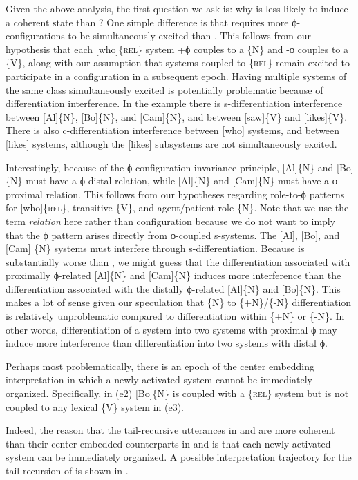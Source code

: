   Given the above analysis, the first question we ask is: why is  less likely to induce a coherent state than ? One simple difference is that  requires more ϕ-configurations to be simultaneously excited than . This follows from our hypothesis that each [who]\{\textsc{rel}\} system +ϕ couples to a \{N\} and -ϕ couples to a \{V\}, along with our assumption that systems coupled to \{\textsc{rel}\} remain excited to participate in a configuration in a subsequent epoch. Having multiple systems of the same class simultaneously excited is potentially problematic because of differentiation interference. In the example there is s-differentiation interference between [Al]\{N\}, [Bo]\{N\}, and [Cam]\{N\}, and between [saw]\{V\} and [likes]\{V\}. There is also c-differentiation interference between [who] systems, and between [likes] systems, although the [likes] subsystems are not simultaneously excited. 

  Interestingly, because of the ϕ-configuration invariance principle, [Al]\{N\} and [Bo]\{N\} must have a ϕ-distal relation, while [Al]\{N\} and [Cam]\{N\} must have a ϕ-proximal relation. This follows from our hypotheses regarding role-to-ϕ patterns for [who]\{\textsc{rel}\}, transitive \{V\}, and agent/patient role \{N\}. Note that we use the term \textit{relation} here rather than configuration because we do not want to imply that the ϕ pattern arises directly from ϕ-coupled s-systems. The [Al], [Bo], and [Cam] \{N\} systems must interfere through s-differentiation. Because  is substantially worse than , we might guess that the differentiation associated with proximally ϕ-related [Al]\{N\} and [Cam]\{N\} induces more interference than the differentiation associated with the distally ϕ-related [Al]\{N\} and [Bo]\{N\}. This makes a lot of sense given our speculation that \{N\} to \{+N\}/\{-N\} differentiation is relatively unproblematic compared to differentiation within \{+N\} or \{-N\}. In other words, differentiation of a system into two systems with proximal ϕ may induce more interference than differentiation into two systems with distal ϕ.

  Perhaps most problematically, there is an epoch of the center embedding interpretation in which a newly activated system cannot be immediately organized. Specifically, in (e2) [Bo]\{N\} is coupled with a \{\textsc{rel}\} system but is not coupled to any lexical \{V\} system in (e3). 

  Indeed, the reason that the tail-recursive utterances in  and  are more coherent than their center-embedded counterparts in  and  is that each newly activated system can be immediately organized. A possible interpretation trajectory for the tail-recursion of  is shown in {}. 

